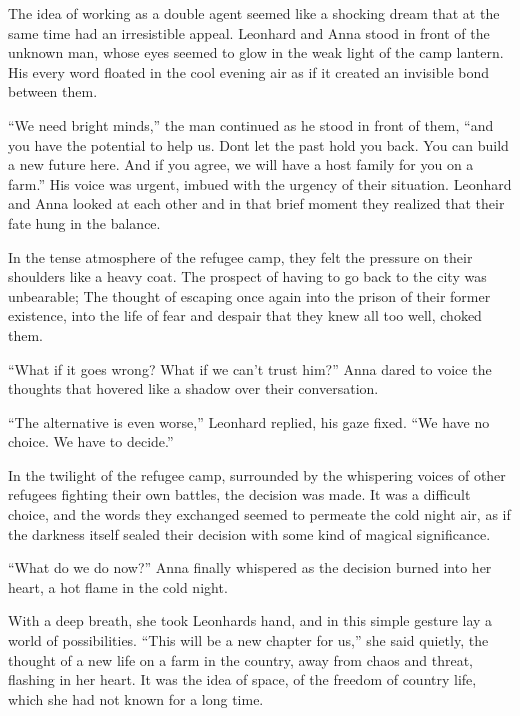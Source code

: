 \documentclass[
]{article}
\begin{document}
The idea of \hspace{0pt}\hspace{0pt}working as a double agent seemed
like a shocking dream that at the same time had an irresistible appeal.
Leonhard and Anna stood in front of the unknown man, whose eyes seemed
to glow in the weak light of the camp lantern. His every word floated in
the cool evening air as if it created an invisible bond between them.

``We need bright minds,'' the man continued as he stood in front of
them, ``and you have the potential to help us. Don\textquotesingle t let
the past hold you back. You can build a new future here. And if you
agree, we will have a host family for you on a farm.'' His voice was
urgent, imbued with the urgency of their situation. Leonhard and Anna
looked at each other and in that brief moment they realized that their
fate hung in the balance.

In the tense atmosphere of the refugee camp, they felt the pressure on
their shoulders like a heavy coat. The prospect of having to go back to
the city was unbearable; The thought of escaping once again into the
prison of their former existence, into the life of fear and despair that
they knew all too well, choked them.

``What if it goes wrong? What if we can't trust him?'' Anna dared to
voice the thoughts that hovered like a shadow over their conversation.

``The alternative is even worse,'' Leonhard replied, his gaze fixed.
``We have no choice. We have to decide.''

In the twilight of the refugee camp, surrounded by the whispering voices
of other refugees fighting their own battles, the decision was made. It
was a difficult choice, and the words they exchanged seemed to permeate
the cold night air, as if the darkness itself sealed their decision with
some kind of magical significance.

``What do we do now?'' Anna finally whispered as the decision burned
into her heart, a hot flame in the cold night.

With a deep breath, she took Leonhard\textquotesingle s hand, and in
this simple gesture lay a world of possibilities. ``This will be a new
chapter for us,'' she said quietly, the thought of a new life on a farm
in the country, away from chaos and threat, flashing in her heart. It
was the idea of \hspace{0pt}\hspace{0pt}space, of the freedom of country
life, which she had not known for a long time.
\end{document}
